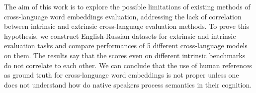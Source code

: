 The aim of this work is to explore the possible limitations of existing methods of cross-language word embeddings evaluation, addressing the lack of correlation between intrinsic and extrinsic cross-language evaluation methods. To prove this hypothesis, we construct English-Russian datasets for extrinsic and intrinsic evaluation tasks and compare performances of 5 different cross-language models on them. The results say that the scores even on different intrinsic benchmarks do not correlate to each other. We can conclude that the use of human references as ground truth for cross-language word embeddings is not proper unless one does not understand how do native speakers process semantics in their cognition.
